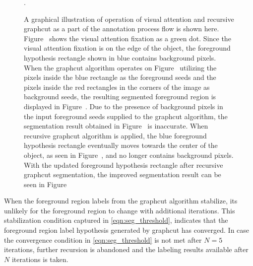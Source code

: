 \documentclass {udthesis}
\begin{document}
\begin{figure}
\begin{subfigure}[]{0.2\textwidth}
      \caption{}
      \label{fig:good_seg_recursive_seg}
  \end{subfigure}
\caption[Illustration of annotation process flow]{A graphical illustration of operation of visual attention and recursive graphcut as a part of the annotation process flow is shown here. Figure~ shows the visual attention fixation as a green dot. Since the visual attention fixation is on the edge of the object, the foreground hypothesis rectangle shown in blue contains background pixels. When the graphcut algorithm operates on Figure~ utilizing the pixels inside the blue rectangle as the foreground seeds and the pixels inside the red rectangles in the corners of the image as background seeds, the resulting segmented foreground region is displayed in Figure~. Due to the presence of background pixels in the input foreground seeds supplied to the graphcut algorithm, the segmentation result obtained in Figure~ is inaccurate. When recursive graphcut algorithm is 
applied, the blue foreground hypothesis rectangle eventually moves towards the center of the object, as seen in Figure~, and no longer contains background pixels. With the updated foreground hypothesis rectangle after recursive graphcut segmentation, the improved segmentation result can be seen in Figure~}.
\label{fig:annotation_good_seg}
\end{figure}	
%
When the foreground region labels from the graphcut algorithm stabilize, its unlikely for the foreground region to change with additional iterations. This stabilization condition captured in \eqref{eqn:seg_threshold}, indicates that the foreground region label hypothesis generated by graphcut has converged. In case the convergence condition in \eqref{eqn:seg_threshold} is not met after $N=5$ iterations, further recursion is abandoned and the labeling results available after $N$ iterations is taken.
\end{document}
